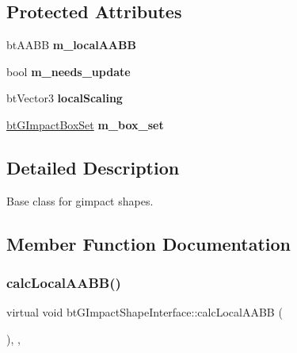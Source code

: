 \subsection*{Protected Attributes}
\begin{DoxyCompactItemize}
\item 
\mbox{\label{classbtGImpactShapeInterface_ac64c6cc7924e11e775e3448adca114c9}} 
bt\+A\+A\+BB {\bfseries m\+\_\+local\+A\+A\+BB}
\item 
\mbox{\label{classbtGImpactShapeInterface_a8d7b7a78a8c65d3339d93fbf607a0d20}} 
bool {\bfseries m\+\_\+needs\+\_\+update}
\item 
\mbox{\label{classbtGImpactShapeInterface_a1d26e1da7195c7e3308a341cdff8b691}} 
bt\+Vector3 {\bfseries local\+Scaling}
\item 
\mbox{\label{classbtGImpactShapeInterface_a52b446c99038ce5614e6839479958910}} 
\hyperlink{classbtGImpactQuantizedBvh}{bt\+G\+Impact\+Box\+Set} {\bfseries m\+\_\+box\+\_\+set}
\end{DoxyCompactItemize}


\subsection{Detailed Description}
Base class for gimpact shapes. 

\subsection{Member Function Documentation}
\mbox{\label{classbtGImpactShapeInterface_a1712a4613e20aa9249514dcd97f0a086}} 
\subsubsection{\texorpdfstring{calc\+Local\+A\+A\+B\+B()}{calcLocalAABB()}\hspace{0.1cm}{\footnotesize\ttfamily [1/2]}}
{\footnotesize\ttfamily virtual void bt\+G\+Impact\+Shape\+Interface\+::calc\+Local\+A\+A\+BB (\begin{DoxyParamCaption}{ }\end{DoxyParamCaption})\hspace{0.3cm}{\ttfamily [inline]}, {\ttfamily [protected]}, {\ttfamily [virtual]}}

